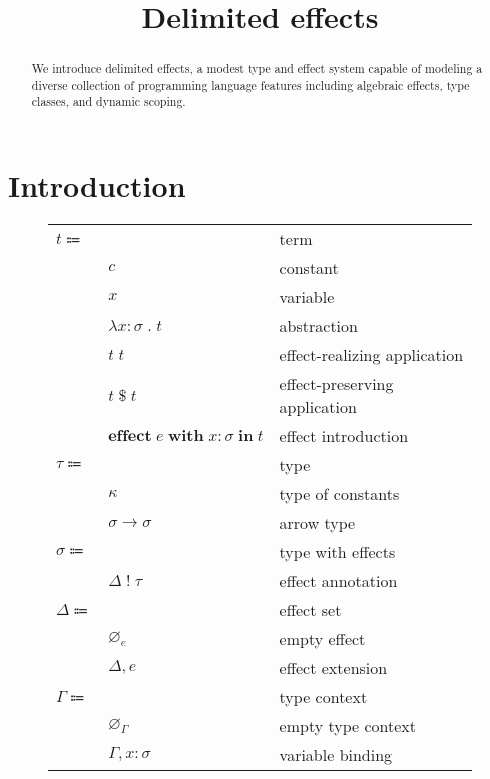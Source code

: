\documentclass[12pt]{article}
\title{Delimited effects}
\date{}
\newcommand\eterm{t}
\newcommand\econst{c}
\newcommand\evar{x}
\newcommand\eabs[2]{\lambda #1 \; . \; #2} %
\newcommand\eapp[2]{#1 \; #2}
\newcommand\eappx[2]{#1 \; \$ \; #2}
\newcommand\eeffect[4]{\textbf{effect} \; #1 \; \textbf{with} \; \tanno{#2}{#3} \; \textbf{in} \; #4}
\newcommand\ttype{\tau}
\newcommand\tconst{\kappa}
\newcommand\tarrow[2]{#1 \rightarrow #2} %
\newcommand\tanno[2]{#1 : #2} %
\newcommand\tx{\sigma}
\newcommand\twithx[2]{#1 \; ! \; #2} %
\newcommand\xeffect{e}
\newcommand\xeffects{\Delta}
\newcommand\xempty{\varnothing_{\xeffect}}
\newcommand\xextend[2]{#1, #2}
\newcommand\ccontext{\Gamma}
\newcommand\cempty{\varnothing_{\ccontext}}
\newcommand\cextend[2]{#1, #2}
\begin{document}
  \maketitle

  \begin{abstract}
    We introduce delimited effects, a modest type and effect system capable of modeling a diverse collection of programming language features including algebraic effects, type classes, and dynamic scoping.
  \end{abstract}

  \section{Introduction}

  \begin{figure}
    \begin{mdframed}
      \begin{center}
        \begin{tabular}{l l l}
          $\eterm \Coloneqq $ & & term \\
          & $\econst$ & constant \\
          & $\evar$ & variable \\
          & $\eabs{\tanno{\evar}{\tx}}{\eterm}$ & abstraction \\
          & $\eapp{\eterm}{\eterm}$ & effect-realizing application \\
          & $\eappx{\eterm}{\eterm}$ & effect-preserving application \\
          & $\eeffect{\xeffect}{\evar}{\tx}{\eterm}$ & effect introduction \\
          $\ttype \Coloneqq$ & & type \\
          & $\tconst$ & type of constants \\
          & $\tarrow{\tx}{\tx}$ & arrow type \\
          $\tx \Coloneqq$ & & type with effects \\
          & $\twithx{\xeffects}{\ttype}$ & effect annotation \\
          $\xeffects \Coloneqq$ & & effect set \\
          & $\xempty$ & empty effect \\
          & $\xextend{\xeffects}{\xeffect}$ & effect extension \\
          $\ccontext \Coloneqq$ & & type context \\
          & $\cempty$ & empty type context \\
          & $\cextend{\ccontext}{\tanno{\evar}{\tx}}$ & variable binding \\
        \end{tabular}
      \end{center}


\end{mdframed}
\end{figure}
\end{document}

